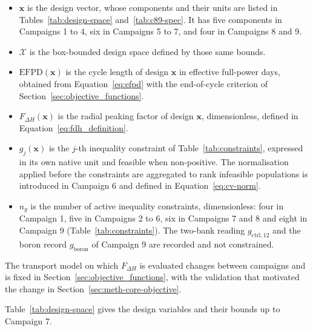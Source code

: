 \begin{itemize}
  \item $\mathbf{x}$ is the design vector, whose components and their
        units are listed in Tables~\ref{tab:design-space}
        and~\ref{tab:c89-spec}. It has five components in Campaigns 1
        to 4, six in Campaigns 5 to 7, and four in Campaigns 8 and 9.

  \item $\mathcal{X}$ is the box-bounded design space defined by those
        same bounds.

  \item $\mathrm{EFPD}(\mathbf{x})$ is the cycle length of design
        $\mathbf{x}$ in effective full-power days, obtained from
        Equation~\eqref{eq:efpd} with the end-of-cycle criterion of
        Section~\ref{sec:objective_functions}.

  \item $F_{\Delta H}(\mathbf{x})$ is the radial peaking factor of
        design $\mathbf{x}$, dimensionless, defined in
        Equation~\eqref{eq:fdh_definition}.

  \item $g_j(\mathbf{x})$ is the $j$-th inequality constraint of
        Table~\ref{tab:constraints}, expressed in its own native unit
        and feasible when non-positive. The normalisation applied
        before the constraints are aggregated to rank infeasible
        populations is introduced in Campaign 6 and defined in
        Equation~\eqref{eq:cv-norm}.

  \item $n_g$ is the number of active inequality constraints,
        dimensionless: four in Campaign 1, five in Campaigns 2 to 6,
        six in Campaigns 7 and 8 and eight in Campaign 9
        (Table~\ref{tab:constraints}). The two-bank reading
        $g_\mathrm{ctrl,12}$ and the boron record $g_\mathrm{boron}$ of
        Campaign 9 are recorded and not constrained.
\end{itemize}

The transport model on which $F_{\Delta H}$ is evaluated changes between
campaigns and is
fixed in Section~\ref{sec:objective_functions}, with the validation
that motivated the change in Section~\ref{sec:meth-core-objective}.

Table~\ref{tab:design-space} gives the design variables and their
bounds up to Campaign 7.


